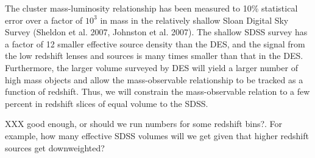 \documentclass[preprint]{aastex}
\begin{document}
The cluster mass-luminosity relationship has been measured to 10\% statistical
error over a factor of $10^3$ in mass in the relatively shallow Sloan Digital
Sky Survey (Sheldon et al. 2007, Johnston et al. 2007).  The shallow SDSS
survey has a factor of 12 smaller effective source density than the DES, and
the signal from the low redshift lenses and sources is many times smaller than
that in the DES.  Furthermore, the larger volume surveyed by DES will yield a
larger number of high mass objects and allow the mass-observable relationship
to be tracked as a function of redshift.  Thus, we will constrain the
mass-observable relation to a few percent in redshift slices of equal volume
to the SDSS.

{\color{red} XXX good enough, or should we run numbers for some redshift bins?.
For example, how many effective SDSS volumes will we get given that higher
redshift sources get downweighted?  }
\end{document}
